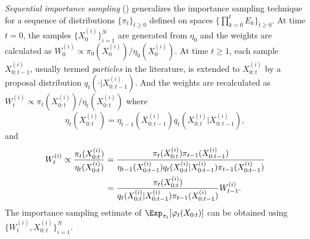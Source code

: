 \documentclass[11pt, bib, hyper, mint, minted=cache]{marticle}
\begin{document}
\emph{Sequential importance sampling} (\sis) generalizes the importance
sampling technique for a sequence of distributions $\{\pi_t\}_{t\ge0}$ defined
on spaces $\{\prod_{k=0}^tE_k\}_{t\ge0}$. At time $t = 0$, the samples
$\{X_0^{(i)}\}_{i=1}^N$ are generated from $\eta_0$ and the weights are
calculated as $W_0^{(i)} \propto \pi_0(X_0^{(i)})/\eta_0(X_0^{(i)})$. At time
$t\ge1$, each sample $X_{0:t-1}^{(i)}$, usually termed \emph{particles} in the
literature, is extended to $X_{0:t}^{(i)}$ by a proposal distribution
$q_t(\cdot|X_{0:t-1}^{(i)})$. And the weights are recalculated as $W_t^{(i)}
\propto \pi_t(X_{0:t}^{(i)})/\eta_t(X_{0:t}^{(i)})$ where
\begin{equation}
  \eta_t(X_{0:t}^{(i)}) =
  \eta_{t-1}(X_{0:t-1}^{(i)})q_t(X_{0:t}^{(i)}|X_{0:t-1}^{(i)}),
\end{equation}
and
\begin{align}
  W_t^{(i)} \propto \frac{\pi_t(X_{0:t}^{(i)})}{\eta_t(X_{0:t}^{(i)})}
  &= \frac{\pi_t(X_{0:t}^{(i)})\pi_{t-1}(X_{0:t-1}^{(i)})}
  {\eta_{t-1}(X_{0:t-1}^{(i)})q_t(X_{0:t}^{(i)}|X_{0:t-1}^{(i)})
    \pi_{t-1}(X_{0:t-1}^{(i)})} \notag\\
  &= \frac{\pi_t(X_{0:t}^{(i)})}
  {q_t(X_{0:t}^{(i)}|X_{0:t-1}^{(i)})\pi_{t-1}(X_{0:t-1}^{(i)})}W_{t-1}^{(i)}.
  \label{eq:si}
\end{align}
The importance sampling estimate of $\Exp_{\pi_t}[\varphi_t(X_{0:t})]$ can be
obtained using $\{W_t^{(i)},X_{0:t}^{(i)}\}_{i=1}^N$.
\end{document}
